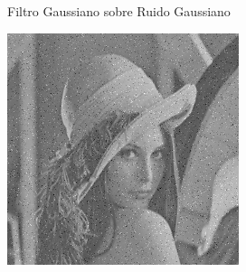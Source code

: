 \documentclass{beamer}
\begin{document}
\begin{frame}[fragile]{Filtro Gaussiano sobre Ruido Gaussiano}
\begin{minipage}{0.25\linewidth}
	\end{minipage}\hfill
	\begin{minipage}{0.25\linewidth}
		\centering
		\includegraphics[width=\linewidth]{../results/lena_gauss_sigma50}
	\end{minipage}
	

\end{frame}
\end{document}

